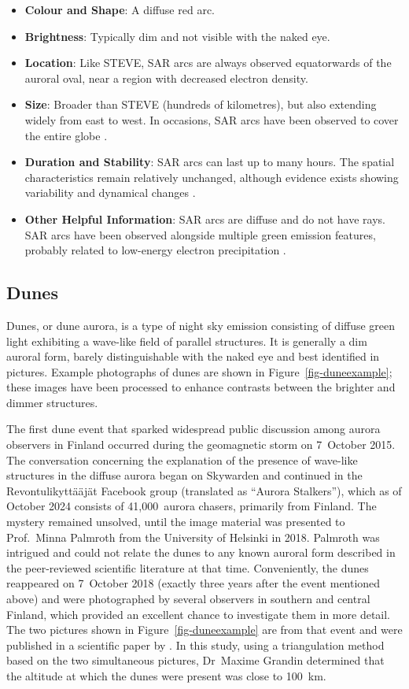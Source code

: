 \documentclass{article}
\renewcommand{\cite}[1]{\parencite{#1}}
\newcommand{\contributed}[1]{%
    \par\noindent
    \begingroup
    \setlength{\leftskip}{1em}%
    \itshape
    Contributors: #1
    \par
    \endgroup
    \vspace{0.5em}
}
\begin{document}
\begin{itemize}
\item {\bf Colour and Shape}: A diffuse red arc.
\item {\bf Brightness}: Typically dim and not visible with the naked eye.
\item {\bf Location}: Like STEVE, SAR arcs are always observed equatorwards of the auroral oval, near a region with decreased electron density.
\item {\bf Size}: Broader than STEVE (hundreds of kilometres), but also extending widely from east to west. In occasions, SAR arcs have been observed to cover the entire globe \cite{Mendillo2013}.
\item {\bf Duration and Stability}: SAR arcs can last up to many hours. The spatial characteristics remain relatively unchanged, although evidence exists showing variability and dynamical changes \cite{Mendillo_2016a}.
\item {\bf Other Helpful Information}: SAR arcs are diffuse and do not have rays. SAR arcs have been observed alongside multiple green emission features, probably related to low-energy electron precipitation \cite{Mendillo_2016a}.
\end{itemize}

\subsection{Dunes}\label{dunes}  
Dunes, or dune aurora, is a type of night sky emission consisting of diffuse green light exhibiting a wave-like field of parallel structures. It is generally a dim auroral form, barely distinguishable with the naked eye and best identified in pictures. Example photographs of dunes are shown in Figure~\ref{fig-duneexample}; these images have been processed to enhance contrasts between the brighter and dimmer structures.

The first dune event that sparked widespread public discussion among aurora observers in Finland occurred during the geomagnetic storm on 7~October 2015. The conversation concerning the explanation of the presence of wave-like structures in the diffuse aurora began on Skywarden and continued in the Revontulikyttääjät Facebook group (translated as ``Aurora Stalkers''), which as of October 2024 consists of 41,000~aurora chasers, primarily from Finland. The mystery remained unsolved, until the image material was presented to Prof.~Minna Palmroth from the University of Helsinki in 2018. Palmroth was intrigued and could not relate the dunes to any known auroral form described in the peer-reviewed scientific literature at that time. Conveniently, the dunes reappeared on 7~October 2018 (exactly three years after the event mentioned above) and were photographed by several observers in southern and central Finland, which provided an excellent chance to investigate them in more detail. The two pictures shown in Figure~\ref{fig-duneexample} are from that event and were published in a scientific paper by \textcite{Palmroth2020}. In this study, using a triangulation method based on the two simultaneous pictures, Dr~Maxime Grandin determined that the altitude at which the dunes were present was close to 100~km. 
\end{document}
